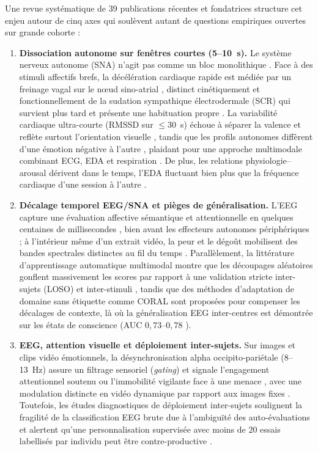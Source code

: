 \documentclass[10pt]{article}
\begin{document}
Une revue systématique de 39 publications récentes et fondatrices structure cet enjeu autour de cinq axes qui soulèvent autant de questions empiriques ouvertes sur grande cohorte :
\begin{enumerate}
\item \textbf{Dissociation autonome sur fenêtres courtes (5--10~s).} Le système nerveux autonome (SNA) n'agit pas comme un bloc monolithique \cite{jennings1980,collet1997}. Face à des stimuli affectifs brefs, la décélération cardiaque rapide est médiée par un freinage vagal sur le nœud sino-atrial \cite{somsen2002,abercrombie2008,palomba2000,hagenaars2014}, distinct cinétiquement et fonctionnellement de la sudation sympathique électrodermale (SCR) qui survient plus tard et présente une habituation propre \cite{chen2014,benedek2010}. La variabilité cardiaque ultra-courte (RMSSD sur $\le 30$~s) échoue à séparer la valence et reflète surtout l'orientation visuelle \cite{schippers2018,munoz2015}, tandis que les profils autonomes diffèrent d'une émotion négative à l'autre \cite{qin2023,siegel2018}, plaidant pour une approche multimodale combinant ECG, EDA et respiration \cite{coelli2026}. De plus, les relations physiologie--arousal dérivent dans le temps, l'EDA fluctuant bien plus que la fréquence cardiaque d'une session à l'autre \cite{sakimura2025}.
\item \textbf{Décalage temporel EEG/SNA et pièges de généralisation.} L'EEG capture une évaluation affective sémantique et attentionnelle en quelques centaines de millisecondes \cite{jeong2026,jomaa2026,alasfour2025}, bien avant les effecteurs autonomes périphériques ; à l'intérieur même d'un extrait vidéo, la peur et le dégoût mobilisent des bandes spectrales distinctes au fil du temps \cite{si2026}. Parallèlement, la littérature d'apprentissage automatique multimodal \cite{liu2021} montre que les découpages aléatoires gonflent massivement les scores par rapport à une validation stricte inter-sujets (LOSO) et inter-stimuli \cite{alshamrani2026,hinduja2023,gerster2026,li2026}, tandis que des méthodes d'adaptation de domaine sans étiquette comme CORAL \cite{sun2016,mihirette2025} sont proposées pour compenser les décalages de contexte, là où la généralisation EEG inter-centres est démontrée sur les états de conscience (AUC $0{,}73$--$0{,}78$ \cite{engemann2018}).
\item \textbf{EEG, attention visuelle et déploiement inter-sujets.} Sur images et clips vidéo émotionnels, la désynchronisation alpha occipito-pariétale (8--13~Hz) assure un filtrage sensoriel (\emph{gating}) et signale l'engagement attentionnel soutenu ou l'immobilité vigilante face à une menace \cite{zumer2014,panitz2019,bacigalupo2022,codispoti2023,stegmann2024}, avec une modulation distincte en vidéo dynamique par rapport aux images fixes \cite{simons2009,kim2021,romeo2022}. Toutefois, les études diagnostiques de déploiement inter-sujets soulignent la fragilité de la classification EEG brute due à l'ambiguïté des auto-évaluations \cite{lifan2024} et alertent qu'une personnalisation supervisée avec moins de 20 essais labellisés par individu peut être contre-productive \cite{khan2026}.

\end{enumerate}
\end{document}
